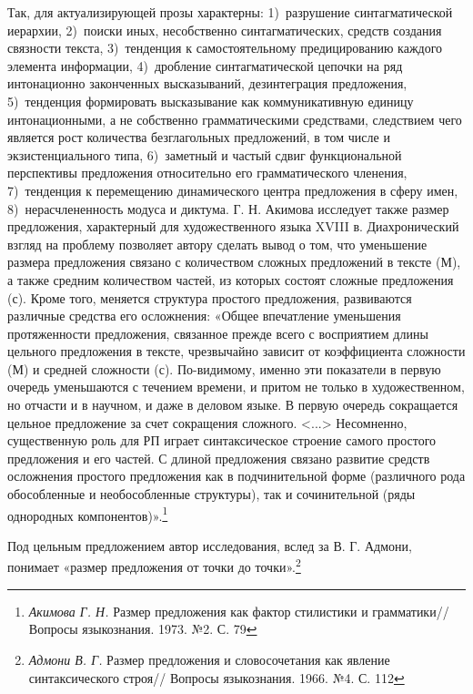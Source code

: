 \documentclass{kursa4}
\begin{document}
      Так, для актуализирующей прозы характерны: 1)~разрушение синтагматической иерархии, 2)~поиски иных, несобственно синтагматических, средств создания связности текста, 3)~тенденция к самостоятельному предицированию каждого элемента информации, 4)~дробление синтагматической цепочки на ряд интонационно законченных высказываний, дезинтеграция предложения, 5)~тенденция формировать высказывание как коммуникативную единицу интонационными, а не собственно грамматическими средствами, следствием чего является рост количества безглагольных предложений, в том числе и экзистенциального типа, 6)~заметный и частый сдвиг функциональной перспективы предложения относительно его грамматического членения, 7)~тенденция к перемещению динамического центра предложения в сферу имен, 8)~нерасчлененность модуса и диктума. Г. Н. Акимова исследует также размер предложения, характерный для художественного языка XVIII в. Диахронический взгляд на проблему позволяет автору сделать вывод о том, что уменьшение размера предложения связано с количеством сложных предложений в тексте (М), а также средним количеством частей, из которых состоят сложные предложения (с). Кроме того, меняется структура простого предложения, развиваются различные средства его осложнения: «Общее впечатление уменьшения протяженности предложения, связанное прежде всего с восприятием длины цельного предложения в тексте, чрезвычайно зависит от коэффициента сложности (М) и средней сложности (с). По-видимому, именно эти показатели в первую очередь уменьшаются с течением времени, и притом не только в художественном, но отчасти и в научном, и даже в деловом языке. В первую очередь сокращается цельное предложение за счет сокращения сложного. \textless{}...\textgreater{}
      Несомненно, существенную роль для РП играет синтаксическое строение самого простого предложения и его частей. С длиной предложения связано развитие средств осложнения простого предложения как в подчинительной форме (различного рода обособленные и необособленные структуры), так и сочинительной (ряды однородных компонентов)».\footnote{\textit{{ Акимова Г. Н. }}{Размер предложения как фактор стилистики и грамматики// Вопросы языкознания. 1973. №2. С. 79}} 

      Под цельным предложением автор исследования, вслед за В. Г. Адмони, понимает «размер предложения от точки до точки».\footnote{\textit{{ Адмони В. Г.}}{ Размер предложения и словосочетания как явление синтаксического строя// Вопросы языкознания. 1966. №4. С. 112}}
\end{document}
